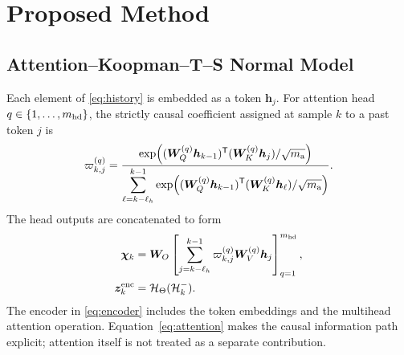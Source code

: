 \documentclass[journal]{IEEEtran}
\newcommand{\T}{\mathsf T}
\newcommand{\1}{\bm 1}
\begin{document}
\section{Proposed Method}
\subsection{Attention--Koopman--T--S Normal Model}
Each element of \eqref{eq:history} is embedded as a token $\bm h_j$. For
attention head $q\in\{1,\ldots,m_{\rm hd}\}$, the strictly causal coefficient
assigned at sample $k$ to a past token $j$ is
\begin{equation}
\varpi_{k,j}^{(q)}
=\frac{\exp\!\left(
(\bm W_Q^{(q)}\bm h_{k-1})^\T
(\bm W_K^{(q)}\bm h_j)/\sqrt{m_{\rm a}}\right)}
{\displaystyle\sum_{\ell=k-\ell_h}^{k-1}
\exp\!\left(
(\bm W_Q^{(q)}\bm h_{k-1})^\T
(\bm W_K^{(q)}\bm h_\ell)/\sqrt{m_{\rm a}}\right)}.
\label{eq:attention}
\end{equation}
The head outputs are concatenated to form
\begin{equation}
\begin{aligned}
\bm\chi_k&=\bm W_O
\left[
\sum_{j=k-\ell_h}^{k-1}\varpi_{k,j}^{(q)}
\bm W_V^{(q)}\bm h_j
\right]_{q=1}^{m_{\rm hd}},
\\
\bm z_k^{\rm enc}&=\mathcal H_\Theta(\mathcal H_k^-).
\end{aligned}
\label{eq:encoder}
\end{equation}
The encoder in \eqref{eq:encoder} includes the token embeddings and the
multihead attention operation. Equation~\eqref{eq:attention} makes the causal
information path explicit; attention itself is not treated as a separate
contribution.
\end{document}
